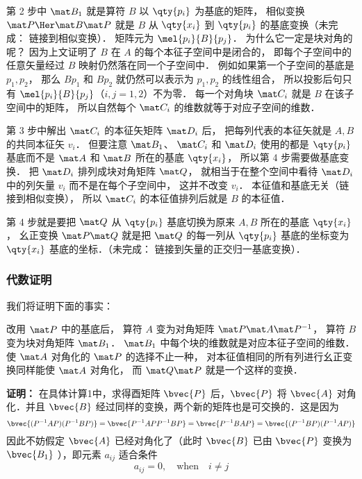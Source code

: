 第 2 步中 $\mat B_1$ 就是算符 $B$ 以 $\qty{p_i}$ 为基底的矩阵， 相似变换 $\mat P\Her \mat B\mat P$ 就是 $B$ 从 $\qty{x_i}$ 到 $\qty{p_i}$ 的基底变换（未完成： 链接到相似变换）． 矩阵元为 $\mel{p_i}{B}{p_j}$． 为什么它一定是块对角的呢？ 因为上文证明了 $B$ 在 $A$ 的每个本征子空间中是闭合的， 即每个子空间中的任意矢量经过 $B$ 映射仍然落在同一个子空间中． 例如如果第一个子空间的基底是 $p_1, p_2$， 那么 $B p_1$ 和 $B p_2$ 就仍然可以表示为 $p_1, p_2$ 的线性组合， 所以投影后句只有 $\mel{p_i}{B}{p_j}$（$i,j=1,2$）不为零． 每一个对角块 $\mat C_i$ 就是 $B$ 在该子空间中的矩阵， 所以自然每个 $\mat C_i$ 的维数就等于对应子空间的维数．

第 3 步中解出 $\mat C_i$ 的本征矢矩阵 $\mat D_i$ 后， 把每列代表的本征矢就是 $A, B$ 的共同本征矢 $v_i$． 但要注意 $\mat B_1$、 $\mat C_i$ 和 $\mat D_i$ 使用的都是 $\qty{p_i}$ 基底而不是 $\mat A$ 和 $\mat B$ 所在的基底 $\qty{x_i}$， 所以第 4 步需要做基底变换． 把 $\mat D_i$ 排列成块对角矩阵 $\mat Q$， 就相当于在整个空间中看待 $\mat D_i$ 中的列矢量 $v_i$ 而不是在每个子空间中， 这并不改变 $v_i$． 本征值和基底无关（链接到相似变换）， 所以 $\mat C_i$ 的本征值排列后就是 $B$ 的本征值．

第 4 步就是要把 $\mat Q$ 从 $\qty{p_i}$ 基底切换为原来 $A, B$ 所在的基底 $\qty{x_i}$， 幺正变换 $\mat P\mat Q$ 就是把 $\mat Q$ 的每一列从 $\qty{p_i}$ 基底的坐标变为 $\qty{x_i}$ 基底的坐标．（未完成： 链接到矢量的正交归一基底变换）．


\subsubsection{代数证明}
我们将证明下面的事实：

改用 $\mat P$ 中的基底后， 算符 $A$ 变为对角矩阵 $\mat P \mat A\mat P^{-1}$， 算符 $B$ 变为块对角矩阵 $\mat B_1$． $\mat B_1$ 中每个块的维数就是对应本征子空间的维数． 使 $\mat A$ 对角化的 $\mat P$ 的选择不止一种， 对本征值相同的所有列进行幺正变换同样能使 $\mat A$ 对角化， 而 $\mat Q\mat P$ 就是一个这样的变换．

\textbf{证明：}
在具体计算1中，求得酉矩阵 $\bvec{P}$ 后，$\bvec{P}$ 将 $\bvec{A}$ 对角化．并且 $\bvec{B}$ 经过同样的变换，两个新的矩阵也是可交换的．这是因为
\begin{equation}
\bvec{(P^{-1}AP)(P^{-1}BP)}=\bvec{P^{-1}APP^{-1}BP}=\bvec{P^{-1}BAP}=\bvec{(P^{-1}BP)(P^{-1}AP)}
\end{equation}
因此不妨假定 $\bvec{A}$ 已经对角化了（此时 $\bvec{B}$ 已由 $\bvec{P}$ 变换为 $\bvec{B_1}$ ），即元素 $a_{ij}$ 适合条件
\begin{equation}
a_{ij}=0,\quad \mathrm{when} \quad i\neq j
\label{Commut_eq25}
\end{equation}

